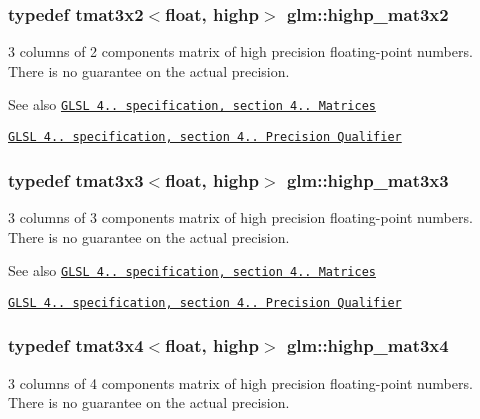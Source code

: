 \subsubsection[{highp\+\_\+mat3x2}]{\setlength{\rightskip}{0pt plus 5cm}typedef tmat3x2$<$float, highp$>$ {\bf glm\+::highp\+\_\+mat3x2}}\label{namespaceglm_aff6a70f319061d2986f1f1db60266a44}
3 columns of 2 components matrix of high precision floating-\/point numbers. There is no guarantee on the actual precision.

\begin{DoxySeeAlso}{See also}
\href{http://www.opengl.org/registry/doc/GLSLangSpec.4.20.8.pdf}{\tt G\+L\+S\+L 4.. specification, section 4.. Matrices} 

\href{http://www.opengl.org/registry/doc/GLSLangSpec.4.20.8.pdf}{\tt G\+L\+S\+L 4.. specification, section 4.. Precision Qualifier} 
\end{DoxySeeAlso}
\hypertarget{namespaceglm_a3ec83a2457d609215bc7a2885d29e255}{}
\subsubsection[{highp\+\_\+mat3x3}]{\setlength{\rightskip}{0pt plus 5cm}typedef tmat3x3$<$float, highp$>$ {\bf glm\+::highp\+\_\+mat3x3}}\label{namespaceglm_a3ec83a2457d609215bc7a2885d29e255}
3 columns of 3 components matrix of high precision floating-\/point numbers. There is no guarantee on the actual precision.

\begin{DoxySeeAlso}{See also}
\href{http://www.opengl.org/registry/doc/GLSLangSpec.4.20.8.pdf}{\tt G\+L\+S\+L 4.. specification, section 4.. Matrices} 

\href{http://www.opengl.org/registry/doc/GLSLangSpec.4.20.8.pdf}{\tt G\+L\+S\+L 4.. specification, section 4.. Precision Qualifier} 
\end{DoxySeeAlso}
\hypertarget{namespaceglm_a15ccad88b491604648fd620a936eac93}{}
\subsubsection[{highp\+\_\+mat3x4}]{\setlength{\rightskip}{0pt plus 5cm}typedef tmat3x4$<$float, highp$>$ {\bf glm\+::highp\+\_\+mat3x4}}\label{namespaceglm_a15ccad88b491604648fd620a936eac93}
3 columns of 4 components matrix of high precision floating-\/point numbers. There is no guarantee on the actual precision.

